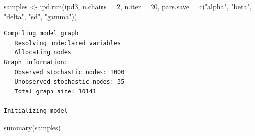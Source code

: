 \documentclass[
  letterpaper,
  DIV=11,
  numbers=noendperiod]{scrreprt}
\newenvironment{Shaded}{\begin{snugshade}}{\end{snugshade}}
\newcommand{\AttributeTok}[1]{\textcolor[rgb]{0.40,0.45,0.13}{#1}}
\newcommand{\DecValTok}[1]{\textcolor[rgb]{0.68,0.00,0.00}{#1}}
\newcommand{\FunctionTok}[1]{\textcolor[rgb]{0.28,0.35,0.67}{#1}}
\newcommand{\NormalTok}[1]{\textcolor[rgb]{0.00,0.23,0.31}{#1}}
\newcommand{\OtherTok}[1]{\textcolor[rgb]{0.00,0.23,0.31}{#1}}
\newcommand{\StringTok}[1]{\textcolor[rgb]{0.13,0.47,0.30}{#1}}
\begin{document}
\begin{Shaded}
\begin{Highlighting}[]
\NormalTok{samples }\OtherTok{\textless{}{-}} \FunctionTok{ipd.run}\NormalTok{(ipd3, }\AttributeTok{n.chains =} \DecValTok{2}\NormalTok{, }\AttributeTok{n.iter =} \DecValTok{20}\NormalTok{, }
                   \AttributeTok{pars.save =} \FunctionTok{c}\NormalTok{(}\StringTok{"alpha"}\NormalTok{, }\StringTok{"beta"}\NormalTok{, }\StringTok{"delta"}\NormalTok{, }\StringTok{"sd"}\NormalTok{, }\StringTok{"gamma"}\NormalTok{))}
\end{Highlighting}
\end{Shaded}

\begin{verbatim}
Compiling model graph
   Resolving undeclared variables
   Allocating nodes
Graph information:
   Observed stochastic nodes: 1000
   Unobserved stochastic nodes: 35
   Total graph size: 10141

Initializing model
\end{verbatim}

\begin{Shaded}
\begin{Highlighting}[]
\FunctionTok{summary}\NormalTok{(samples)}
\end{Highlighting}
\end{Shaded}
\end{document}
